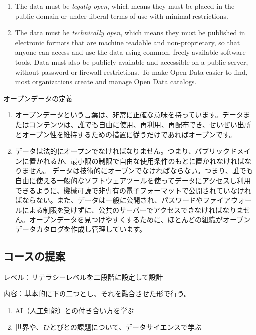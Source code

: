 \documentclass[
]{bxjsbook}
\providecommand{\tightlist}{%
  \setlength{\itemsep}{0pt}\setlength{\parskip}{0pt}}
\theoremstyle{definition}
\theoremstyle{definition}
\theoremstyle{definition}
\theoremstyle{definition}
\theoremstyle{remark}
\begin{document}
\begin{enumerate}
\def\labelenumi{\arabic{enumi}.}
\tightlist
\item
  The data must be \emph{legally open}, which means they must be placed in the public domain or under liberal terms of use with minimal restrictions.
\item
  The data must be \emph{technically open}, which means they must be published in electronic formats that are machine readable and non-proprietary, so that anyone can access and use the data using common, freely available software tools. Data must also be publicly available and accessible on a public server, without password or firewall restrictions. To make Open Data easier to find, most organizations create and manage Open Data catalogs.
\end{enumerate}

オープンデータの定義

\begin{enumerate}
\def\labelenumi{\arabic{enumi}.}
\item
  オープンデータという言葉は、非常に正確な意味を持っています。データまたはコンテンツは、誰でも自由に使用、再利用、再配布でき、せいぜい出所とオープン性を維持するための措置に従うだけであればオープンです。
\item
  データは法的にオープンでなければなりません。つまり、パブリックドメインに置かれるか、最小限の制限で自由な使用条件のもとに置かれなければなりません。
  データは技術的にオープンでなければならない。つまり、誰でも自由に使える一般的なソフトウェアツールを使ってデータにアクセスし利用できるように、機械可読で非専有の電子フォーマットで公開されていなければならない。また、データは一般に公開され、パスワードやファイアウォールによる制限を受けずに、公共のサーバーでアクセスできなければなりません。オープンデータを見つけやすくするために、ほとんどの組織がオープンデータカタログを作成し管理しています。
\end{enumerate}

\hypertarget{ux30b3ux30fcux30b9ux306eux63d0ux6848}{%
\subsection{コースの提案}\label{ux30b3ux30fcux30b9ux306eux63d0ux6848}}

レベル：リテラシーレベルを二段階に設定して設計

内容：基本的に下の二つとし、それを融合させた形で行う。

\begin{enumerate}
\def\labelenumi{\arabic{enumi}.}
\tightlist
\item
  AI（人工知能）との付き合い方を学ぶ
\item
  世界や、ひとびとの課題について、データサイエンスで学ぶ
\end{enumerate}
\end{document}
